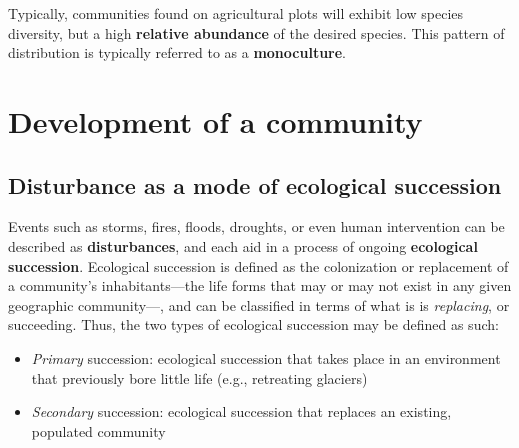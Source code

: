 \documentclass{article}
\begin{document}
Typically, communities found on agricultural plots will exhibit low species
diversity, but a high \textbf{relative abundance} of the desired species. This
pattern of distribution is typically referred to as a \textbf{monoculture}.

\section{Development of a community}

\subsection{Disturbance as a mode of ecological succession}

Events such as storms, fires, floods, droughts, or even human intervention can be
described as \textbf{disturbances}, and each aid in a process of ongoing
\textbf{ecological succession}. Ecological succession is defined as the colonization
or replacement of a community's inhabitants---the life forms that may or may not exist
in any given geographic community---, and can be classified in terms of what is is
\emph{replacing}, or succeeding. Thus, the two types of ecological succession may be
defined as such:

\begin{itemize}
	\item \emph{Primary} succession: ecological succession that takes place in an
	environment that previously bore little life (e.g., retreating glaciers)
  \item \emph{Secondary} succession: ecological succession that replaces an existing,
	populated community
\end{itemize}
\end{document}
